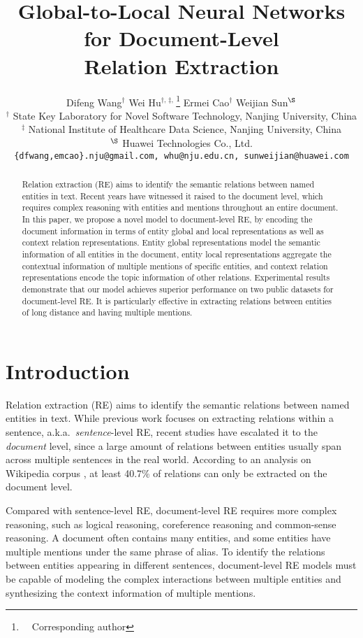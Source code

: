 \documentclass[11pt,a4paper]{article}
\title{Global-to-Local Neural Networks for Document-Level\\ Relation Extraction}
\author{Difeng Wang$^\dag$ \quad Wei Hu$^{\dag,\,\ddag,\,}$\thanks{\ \ Corresponding author} \quad Ermei Cao$^\dag$ \quad Weijian Sun$^\S$\\
	$^\dagger$ State Key Laboratory for Novel Software Technology, Nanjing University, China \\
	$^\ddagger$ National Institute of Healthcare Data Science, Nanjing University, China\\
	$^\S$ Huawei Technologies Co., Ltd. \\
	\texttt{\{dfwang,emcao\}.nju@gmail.com,\,whu@nju.edu.cn,\,sunweijian@huawei.com} 
}
\date{}
\begin{document}
\maketitle

\begin{abstract}
Relation extraction (RE) aims to identify the semantic relations between named entities in text. Recent years have witnessed it raised to the document level, which requires complex reasoning with entities and mentions throughout an entire document. In this paper, we propose a novel model to document-level RE, by encoding the document information in terms of entity global and local representations as well as context relation representations. Entity global representations model the semantic information of all entities in the document, entity local representations aggregate the contextual information of multiple mentions of specific entities, and context relation representations encode the topic information of other relations. Experimental results demonstrate that our model achieves superior performance on two public datasets for document-level RE. It is particularly effective in extracting relations between entities of long distance and having multiple mentions.
\end{abstract}

\section{Introduction}

Relation extraction (RE) aims to identify the semantic relations between named entities in text. While previous work \cite{zeng2014relation,zhang2015bidirectional,zhang2018graph} focuses on extracting relations within a sentence, a.k.a.~\emph{sentence}-level RE, recent studies \cite{verga2018simultaneously,christopoulou2019connecting,sahu2019inter,yao2019docred} have escalated it to the \emph{document} level, since a large amount of relations between entities usually span across multiple sentences in the real world. According to an analysis on Wikipedia corpus \cite{yao2019docred}, at least 40.7\% of relations can only be extracted on the document level.

Compared with sentence-level RE, document-level RE requires more complex reasoning, such as logical reasoning, coreference reasoning and common-sense reasoning. A document often contains many entities, and some entities have multiple mentions under the same phrase of alias. To identify the relations between entities appearing in different sentences, document-level RE models must be capable of modeling the complex interactions between multiple entities and synthesizing the context information of multiple mentions. 
\end{document}
